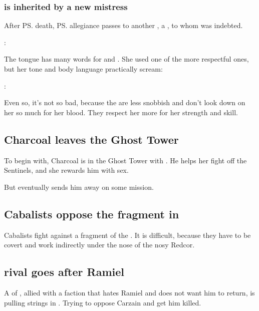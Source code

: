 \subsubsection{\Achsah{} is inherited by a new mistress}
After \ps{\Teshrial} death, \ps{\Achsah} allegiance passes to another \resvil, a \Mystraacht{}, to whom \Teshrial{} was indebted. 

\Mystraacht: 

The \resphan{} tongue has many words for  and . 
She used one of the more respectful ones, but her tone and body language practically scream: 

\Achsah: 

Even so, it's not so bad, because the \Mystraacht{} are less snobbish and don't look down on her so much for her blood. 
They respect her more for her strength and skill. 









\subsection{Charcoal leaves the Ghost Tower}
To begin with, Charcoal is in the Ghost Tower with \Achsah. He helps her fight off the Sentinels, and she rewards him with sex. 

But eventually \Achsah{} sends him away on some mission. 









\subsection{Cabalists oppose the \Haskelek{} fragment in \Redce}
\Redcean{} Cabalists fight against a fragment of the \Haskelek. 
It is difficult, because they have to be covert and work indirectly under the nose of the nosy Redcor. 









\subsection{\Mystraacht{} rival goes after Ramiel}
A \resphan{} of \Mystraacht, allied with a faction that hates Ramiel and does not want him to return, is pulling strings in \Redce. 
Trying to oppose Carzain and get him killed. 

